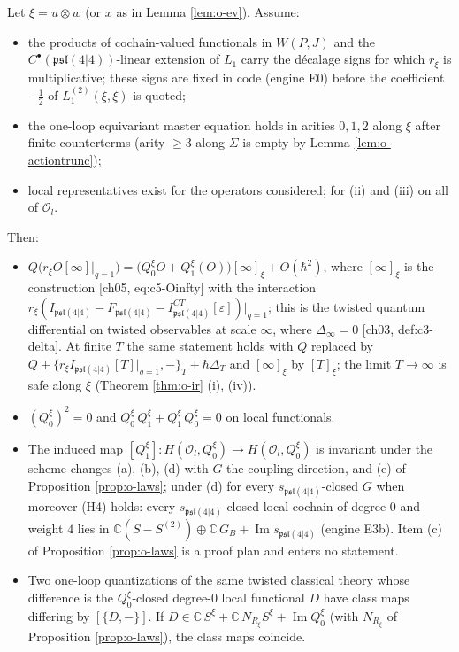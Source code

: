 \begin{theorem}
\label{thm:o-twist}
Let $\xi=u\otimes w$ (or $x$ as in Lemma \ref{lem:o-ev}). Assume:
\begin{itemize}
\item[(H1)] the products of cochain-valued functionals in $W(P,J)$ and the $C^\bullet(\mathfrak{psl}(4|4))$-linear extension of $L_1$ carry the décalage signs for which $r_\xi$ is multiplicative; these signs are fixed in code (engine E0) before the coefficient $-\tfrac12$ of $L_1^{(2)}(\xi,\xi)$ is quoted;
\item[(H2)] the one-loop equivariant master equation holds in arities $0,1,2$ along $\xi$ after finite counterterms (arity $\ge3$ along $\Sigma$ is empty by Lemma \ref{lem:o-actiontrunc});
\item[(H3)] local representatives exist for the operators considered; for (ii) and (iii) on all of $\mathscr O_l$.
\end{itemize}
Then:
\begin{itemize}
\item[(i)] $Q\big(r_\xi O[\infty]|_{q=1}\big)=\big(Q_0^\xi O+Q_1^\xi(O)\big)[\infty]_\xi+O(\hbar^2)$, where $[\infty]_\xi$ is the construction [ch05, eq:c5-Oinfty] with the interaction $r_\xi(I_{\mathfrak{psl}(4|4)}-F_{\mathfrak{psl}(4|4)}-I^{CT}_{\mathfrak{psl}(4|4)}[\varepsilon])|_{q=1}$; this is the twisted quantum differential on twisted observables at scale $\infty$, where $\Delta_\infty=0$ [ch03, def:c3-delta]. At finite $T$ the same statement holds with $Q$ replaced by $Q+\{r_\xi I_{\mathfrak{psl}(4|4)}[T]|_{q=1},-\}_T+\hbar\Delta_T$ and $[\infty]_\xi$ by $[T]_\xi$; the limit $T\to\infty$ is safe along $\xi$ (Theorem \ref{thm:o-ir} (i), (iv)).
\item[(ii)] $(Q_0^\xi)^2=0$ and $Q_0^\xi\,Q_1^\xi+Q_1^\xi\,Q_0^\xi=0$ on local functionals.
\item[(iii)] The induced map $[Q_1^\xi]\colon H(\mathscr O_l,Q_0^\xi)\to H(\mathscr O_l,Q_0^\xi)$ is invariant under the scheme changes (a), (b), (d) with $G$ the coupling direction, and (e) of Proposition \ref{prop:o-laws}; under (d) for every $s_{\mathfrak{psl}(4|4)}$-closed $G$ when moreover (H4) holds: every $s_{\mathfrak{psl}(4|4)}$-closed local cochain of degree $0$ and weight $4$ lies in $\mathbb C(S-S^{(2)})\oplus\mathbb C\,G_B+\operatorname{Im}s_{\mathfrak{psl}(4|4)}$ (engine E3b). Item (c) of Proposition \ref{prop:o-laws} is a proof plan and enters no statement.
\item[(iv)] Two one-loop quantizations of the same twisted classical theory whose difference is the $Q_0^\xi$-closed degree-$0$ local functional $D$ have class maps differing by $[\{D,-\}]$. If $D\in\mathbb C\,S^\xi+\mathbb C\,N_{R_\xi}S^\xi+\operatorname{Im}Q_0^\xi$ (with $N_{R_\xi}$ of Proposition \ref{prop:o-laws}), the class maps coincide.
\end{itemize}
\end{theorem}

